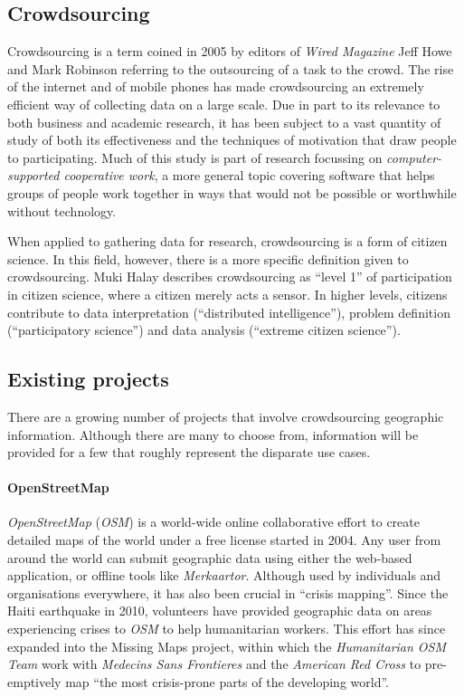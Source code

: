 \documentclass{article}
\begin{document}
		\subsection{Crowdsourcing}
		Crowdsourcing is a term coined in 2005 by editors of \emph{Wired Magazine} Jeff Howe and Mark Robinson\cite{safire_fat_2009} referring to the outsourcing of a task to the crowd. The rise of the internet and of mobile phones has made crowdsourcing an extremely efficient way of collecting data on a large scale. Due in part to its relevance to both business and academic research, it has been subject to a vast quantity of study of both its effectiveness\cite{brabham_effectiveness_2010} and the techniques of motivation that draw people to participating\cite{hossain_users_2012}. Much of this study is part of research focussing on \emph{computer-supported cooperative work}, a more general topic covering software that helps groups of people work together in ways that would not be possible or worthwhile without technology.

		When applied to gathering data for research, crowdsourcing is a form of citizen science\cite{_citizen_2015}. In this field, however, there is a more specific definition given to crowdsourcing. Muki Halay describes crowdsourcing as ``level 1'' of participation in citizen science, where a citizen merely acts a sensor. In higher levels, citizens contribute to data interpretation (``distributed intelligence''), problem definition (``participatory science'') and data analysis (``extreme citizen science'')\cite{haklay_citizen_2013}.

		\subsection{Existing projects}
		There are a growing number of projects that involve crowdsourcing geographic information. Although there are many to choose from, information will be provided for a few that roughly represent the disparate use cases.

		\paragraph{OpenStreetMap}
		\emph{OpenStreetMap} (\emph{OSM}) is a world-wide online collaborative effort to create detailed maps of the world under a free\cite{_open_2012} license started in 2004. Any user from around the world can submit geographic data using either the web-based application, or offline tools like \emph{Merkaartor}. Although used by individuals and organisations everywhere, it has also been crucial in ``crisis mapping''. Since the Haiti earthquake in 2010, volunteers have provided geographic data on areas experiencing crises to \emph{OSM} to help humanitarian workers\cite{_our_????}. This effort has since expanded into the Missing Maps project, within which the \emph{Humanitarian OSM Team} work with \emph{Medecins Sans Frontieres} and the \emph{American Red Cross} to pre-emptively map ``the most crisis-prone parts of the developing world''\cite{_missing_????}.
\end{document}
